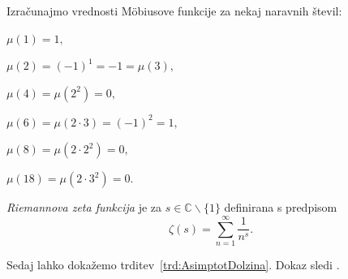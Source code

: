 \documentclass[mat1]{fmfdelo}
\begin{document}
\begin{primer}
Izračunajmo vrednosti M\"obiusove funkcije za nekaj naravnih števil:

\( \mu(1)=1, \)

\( \mu(2)=(-1)^{1}=-1=\mu(3), \)

\( \mu(4)=\mu(2^{2})=0, \)

\( \mu(6)=\mu(2\cdot3)=(-1)^{2}=1, \)

\( \mu(8)=\mu(2\cdot2^{2})=0, \)

\( \mu(18)=\mu(2\cdot3^{2})=0. \)
\end{primer}

\begin{definicija}
\label{def:RiemZeta}
\emph{Riemannova zeta funkcija} je za
 $s\in\mathbb{C}\backslash\{1\}$
definirana s predpisom
\begin{equation}
\zeta(s) = \sum_{n=1}^{\infty}\frac{1}{n^s}.
\end{equation}
\end{definicija}

%
Sedaj lahko dokažemo trditev~\ref{trd:AsimptotDolzina}. Dokaz sledi \cite[poglavje 18.5, str.~268]{hardy}.
\end{document}
